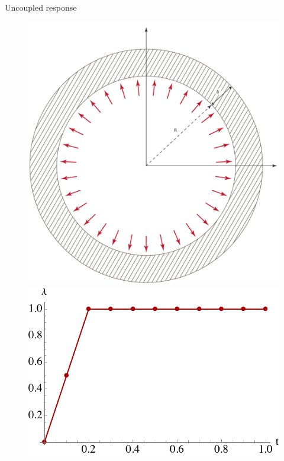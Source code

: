 \documentclass[aspectratio=169,xcolor=dvipsnames]{beamer}
\begin{document}
\begin{frame}{Uncoupled response}
\begin{figure}
	\begin{minipage}{\linewidth}
	\begin{minipage}{0.22\linewidth}\centering
			\includegraphics[width=\linewidth]{circle.pdf}
		\end{minipage}\hfill
	\begin{minipage}{0.3\linewidth}\centering
	\includegraphics[width=\linewidth]{lambda_chemoelastic.pdf}

\end{minipage}
\end{minipage}
\end{figure}
\end{frame}
\end{document}
